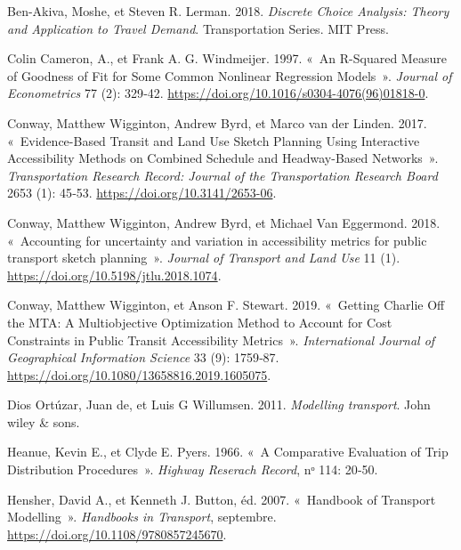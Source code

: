 \documentclass[
  10pt,
  a4paper,
  numbers=noendperiod,
  DIV=9]{scrreprt}
\newlength{\cslhangindent}
\newlength{\cslentryspacingunit} %
\newenvironment{CSLReferences}[2] %
 {%
  \setlength{\parindent}{0pt}
  \ifodd #1
  \let\oldpar\par
  \def\par{\hangindent=\cslhangindent\oldpar}
  \fi
  \setlength{\parskip}{#2\cslentryspacingunit}
 }%
 {}
\begin{document}
\hypertarget{refs}{}
\begin{CSLReferences}{1}{0}
\leavevmode{}%
Ben-Akiva, Moshe, et Steven R. Lerman. 2018. \emph{Discrete Choice
Analysis: Theory and Application to Travel Demand}. Transportation
Series. MIT Press.

\leavevmode{}%
Colin Cameron, A., et Frank A. G. Windmeijer. 1997. {«~An R-Squared
Measure of Goodness of Fit for Some Common Nonlinear Regression
Models~»}. \emph{Journal of Econometrics} 77 (2): 329‑42.
\url{https://doi.org/10.1016/s0304-4076(96)01818-0}.

\leavevmode{}%
Conway, Matthew Wigginton, Andrew Byrd, et Marco van der Linden. 2017.
{«~Evidence-Based Transit and Land Use Sketch Planning Using Interactive
Accessibility Methods on Combined Schedule and Headway-Based
Networks~»}. \emph{Transportation Research Record: Journal of the
Transportation Research Board} 2653 (1): 45‑53.
\url{https://doi.org/10.3141/2653-06}.

\leavevmode{}%
Conway, Matthew Wigginton, Andrew Byrd, et Michael Van Eggermond. 2018.
{«~Accounting for uncertainty and variation in accessibility metrics for
public transport sketch planning~»}. \emph{Journal of Transport and Land
Use} 11 (1). \url{https://doi.org/10.5198/jtlu.2018.1074}.

\leavevmode{}%
Conway, Matthew Wigginton, et Anson F. Stewart. 2019. {«~Getting Charlie
Off the MTA: A Multiobjective Optimization Method to Account for Cost
Constraints in Public Transit Accessibility Metrics~»}.
\emph{International Journal of Geographical Information Science} 33 (9):
1759‑87. \url{https://doi.org/10.1080/13658816.2019.1605075}.

\leavevmode{}%
Dios Ortúzar, Juan de, et Luis G Willumsen. 2011. \emph{Modelling
transport}. John wiley \& sons.

\leavevmode{}%
Heanue, Kevin E., et Clyde E. Pyers. 1966. {«~A Comparative Evaluation
of Trip Distribution Procedures~»}. \emph{Highway Reserach Record}, nᵒ
114: 20‑50.

\leavevmode{}%
Hensher, David A., et Kenneth J. Button, éd. 2007. {«~Handbook of
Transport Modelling~»}. \emph{Handbooks in Transport}, septembre.
\url{https://doi.org/10.1108/9780857245670}.


\end{CSLReferences}
\end{document}
